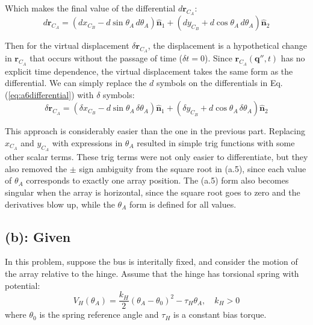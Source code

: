 \documentclass[titlepage]{article}
\begin{document}
\begin{mdframed}[linewidth=1pt, innertopmargin=10pt, innerbottommargin=10pt]
	Which makes the final value of the differential $d\boldsymbol{r}_{C_A}$:
	\begin{equation}
		d\boldsymbol{r}_{C_A}=\left(dx_{C_B}-d\sin\theta_A\,d\theta_A\right)\hat{\boldsymbol{n}}_1+\left(dy_{C_B}+d\cos\theta_A\,d\theta_A\right)\hat{\boldsymbol{n}}_2
		\label{eq:a6differential}
	\end{equation}
\end{mdframed}
\begin{mdframed}[linewidth=1pt, innertopmargin=10pt, innerbottommargin=10pt]
	Then for the virtual displacement $\delta\boldsymbol{r}_{C_A}$, the displacement is a hypothetical change in $\boldsymbol{r}_{C_A}$ that occurs without the passage of time ($\delta t=0$). Since $\boldsymbol{r}_{C_A}(\boldsymbol{q}'',t)$ has no explicit time dependence, the virtual displacement takes the same form as the differential. We can simply replace the $d$ symbols on the differentials in Eq. (\ref{eq:a6differential}) with $\delta$ symbols:
	\begin{equation}
		\delta\boldsymbol{r}_{C_A}=\left(\delta x_{C_B}-d\sin\theta_A\,\delta\theta_A\right)\hat{\boldsymbol{n}}_1+\left(\delta y_{C_B}+d\cos\theta_A\,\delta\theta_A\right)\hat{\boldsymbol{n}}_2
	\end{equation}
\end{mdframed}
\begin{mdframed}[linewidth=1pt, innertopmargin=10pt, innerbottommargin=10pt]
	This approach is considerably easier than the one in the previous part. Replacing $x_{C_A}$ and $y_{C_A}$ with expressions in $\theta_A$ resulted in simple trig functions with some other scalar terms. These trig terms were not only easier to differentiate, but they also removed the $\pm$ sign ambiguity from the square root in (a.5), since each value of $\theta_A$ corresponds to exactly one array position. The (a.5) form also becomes singular when the array is horizontal, since the square root goes to zero and the derivatives blow up, while the $\theta_A$ form is defined for all values.
\end{mdframed}

\newpage

\subsection*{(b): Given}
In this problem, suppose the bus is interitally fixed, and consider the motion of the array relative to the hinge. Assume that the hinge has torsional spring with potential:
\begin{equation}
	V_H(\theta_A)=\frac{k_H}{2}(\theta_A-\theta_0)^2-\tau_H\theta_A,\quad k_H>0
	\label{eq:bsetup}
\end{equation}
where $\theta_0$ is the spring reference angle and $\tau_H$ is a constant bias torque.\\
\end{document}
